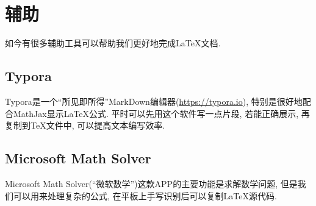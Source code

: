 \chapter{辅助}

如今有很多辅助工具可以帮助我们更好地完成\LaTeX{}文档.

\section{Typora}

Typora是一个``所见即所得''MarkDown编辑器(\url{https://typora.io}), 特别是很好地配合MathJax显示\LaTeX{}公式. 
平时可以先用这个软件写一点片段, 若能正确展示, 再复制到\TeX{}文件中, 可以提高文本编写效率.

\section{Microsoft Math Solver}

Microsoft Math Solver(``微软数学'')这款APP的主要功能是求解数学问题, 但是我们可以用来处理复杂的公式, 在平板上手写识别后可以复制\LaTeX{}源代码.